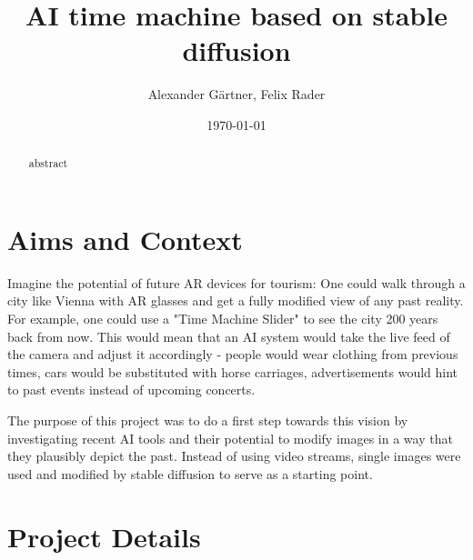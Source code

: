 \documentclass[english,notitlepage,smartquotes]{hgbreport}
\begin{document}

\author{Alexander Gärtner, Felix Rader}                    
\title{ AI time machine based on stable diffusion }	                 
\date{\today}

\maketitle

\begin{abstract}\noindent
	abstract
\end{abstract}

\tableofcontents

\chapter{Aims and Context}

Imagine the potential of future AR devices for tourism: One could walk through a city like Vienna with AR glasses and get a fully modified view of any past reality. For example, one could use a "Time Machine Slider" to see the city 200 years back from now. This would mean that an AI system would take the live feed of the camera and adjust it accordingly - people would wear clothing from previous times, cars would be substituted with horse carriages, advertisements would hint to past events instead of upcoming concerts.  

The purpose of this project was to do a first step towards this vision by investigating recent AI tools and their potential to modify images in a way that they plausibly depict the past. Instead of using video streams,  single images were used and modified by stable diffusion to serve as a starting point.


\chapter{Project Details}
\end{document}
